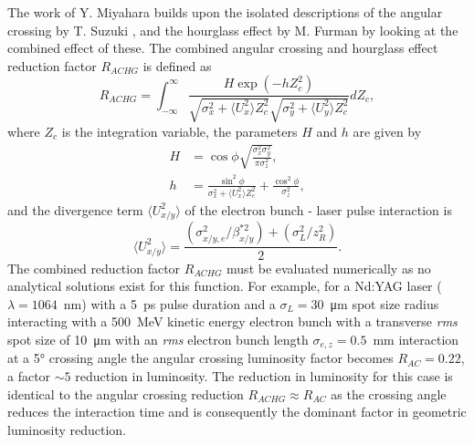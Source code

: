 \documentclass[../main.tex]{subfiles}
\begin{document}
The work of Y. Miyahara \cite{miyahara2008luminosity} builds upon the isolated descriptions of the angular crossing by T. Suzuki \cite{suzuki1976general}, and the hourglass effect by M. Furman \cite{furman1991hourglas} by looking at the combined effect of these. The combined angular crossing and hourglass effect reduction factor $R_{ACHG}$ is defined as
\begin{equation}
R_{ACHG} = \int_{-\infty}^{\infty}\frac{H\exp\left(-hZ_{c}^{2}\right)}{\sqrt{\sigma_{x}^{2}+\langle U_{x}^2\rangle Z_{c}^{2}}\sqrt{\sigma_{y}^{2}+\langle U_{y}^{2}\rangle Z_{c}^{2}}}dZ_{c},
\label{eq:miyahara_combined_reduction}    
\end{equation}
where $Z_{c}$ is the integration variable, the parameters $H$ and $h$ are given by
\begin{align}
H &= \cos\phi\sqrt{\frac{\sigma_{x}^{2}\sigma_{y}^{2}}{\pi\sigma_{z}^{2}}},
\label{eq:miyahara_H_parameter} \\
h &= \frac{\sin^{2}\phi}{\sigma_{x}^{2}+\langle U_{x}^{2}\rangle Z_{c}^{2}}+\frac{\cos^{2}\phi}{\sigma_{z}^{2}},
\label{eq:miyahara_h_parameter}
\end{align}
and the divergence term $\langle U_{x/y}^{2}\rangle$ of the electron bunch - laser pulse interaction is
\begin{equation}
\langle U_{x/y}^{2}\rangle = \frac{\left(\sigma_{x/y,e}^{2}/\beta_{x/y}^{*2}\right)+\left(\sigma_{L}^{2}/z_{R}^{2}\right)}{2}.    
\end{equation}
The combined reduction factor $R_{ACHG}$ must be evaluated numerically as no analytical solutions exist for this function.
For example, for a Nd:YAG laser ($\lambda = 1064$~\si{\nano\meter}) with a 5~\si{\pico\second} pulse duration and a $\sigma_{L} = 30$~\si{\micro\meter} spot size radius interacting with a 500~\si{\mega\electronvolt} kinetic energy electron bunch with a transverse \textit{rms} spot size of 10~\si{\micro\meter} with an \textit{rms} electron bunch length $\sigma_{e,z} = 0.5$~\si{\milli\meter} interaction at a 5\si{\degree} crossing angle the angular crossing luminosity factor becomes $R_{AC} = 0.22$, a factor $\sim5$ reduction in luminosity. The reduction in luminosity for this case is identical to the angular crossing reduction $R_{ACHG}\approx R_{AC}$ as the crossing angle reduces the interaction time and is consequently the dominant factor in geometric luminosity reduction.
\end{document}
